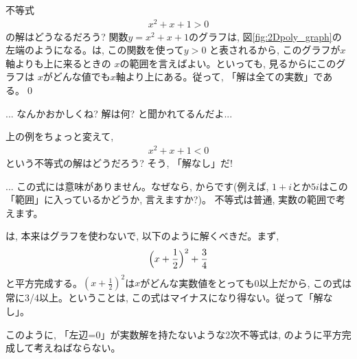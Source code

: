 \begin{exmpl} 不等式
\begin{eqnarray}
x^2+x+1>0\label{eq:x2_x_1gt0}
\end{eqnarray}
の解はどうなるだろう?
関数$y=x^2+x+1$のグラフは, 図\ref{fig:2Dpoly_graph}の
左端のようになる。は, この関数を使って$y>0$
と表されるから, このグラフが$x$軸よりも上に来るときの
$x$の範囲を言えばよい。といっても, 見るからにこのグラフは
$x$がどんな値でも$x$軸より上にある。従って, 「解は全ての実数」である。\qed\end{exmpl}

\begin{freqmiss}{\small{}
 ... なんかおかしくね? 解は何? と聞かれてるんだよ...}\end{freqmiss}

上の例をちょっと変えて, 
\begin{eqnarray}
x^2+x+1<0\label{eq:x2_x_1lt0}
\end{eqnarray}
という不等式の解はどうだろう? そう, 「解なし」だ!

\begin{freqmiss}\label{ex:2dim_ineq_irr}{\small{} ... この式には意味がありません。なぜなら, 
からです(例えば, $1+i$とか$5i$はこの「範囲」に入っているかどうか, 言えますか?)。
不等式は普通, 実数の範囲で考えます。}\end{freqmiss}
\mv

は, 本来はグラフを使わないで, 以下のように解くべきだ。まず, 
\begin{eqnarray}
\Bigl(x+\frac{1}{2}\Bigr)^2+\frac{3}{4}\label{eq:2dim_ineq_irr5}
\end{eqnarray}
と平方完成する。$(x+\frac{1}{2})^2$は$x$がどんな実数値をとっても0以上だから, 
この式は常に3/4以上。ということは, この式はマイナスになり得ない。従って「解なし」。

このように, 「左辺=0」が実数解を持たないような2次不等式は, 
のように平方完成して考えねばならない。\hv

